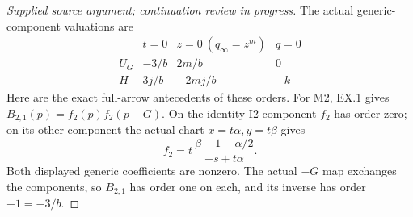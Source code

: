 \begin{proof}[Supplied source argument; continuation review in progress]
The actual generic-component valuations are
\[
\begin{array}{c|ccc}
 &t=0&z=0\ (q_\infty=z^m)&q=0\\ \hline
 U_G&-3/b&2m/b&0\\
 H&3j/b&-2mj/b&-k
\end{array}                                                     \tag{EF.30}
\]
Here are the exact full-arrow antecedents of these orders. For M2,
EX.1 gives \(B_{2,1}(p)=f_2(p)f_2(p-G)\). On the identity I2
component \(f_2\) has order zero; on its other component the actual
chart \(x=t\alpha,y=t\beta\) gives
\[
 f_2=t\,\frac{\beta-1-\alpha/2}{-s+t\alpha}.
 \tag{EF.30a}
\]
Both displayed generic coefficients are nonzero. The actual \(-G\)
map exchanges the components, so \(B_{2,1}\) has order one on each,
and its inverse has order \(-1=-3/b\).


\end{proof}
